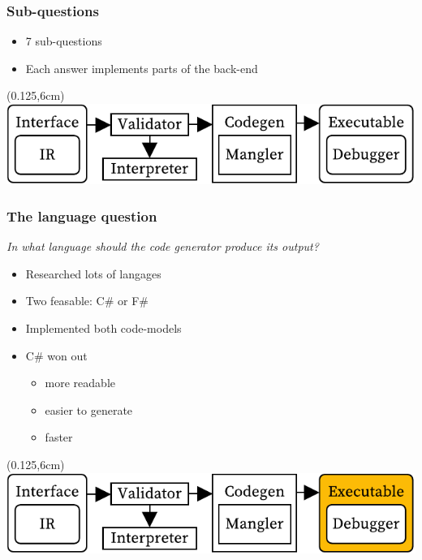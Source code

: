 \documentclass[xetex,serif]{beamer}
\begin{document}
\begin{frame}
\end{frame}\begin{frame}[t]\frametitle{Sub-questions}
\begin{itemize}
    \item 7 sub-questions
    \item Each answer implements parts of the back-end
\end{itemize}
\begin{textblock*}{0.75\paperwidth}(0.125\paperwidth,6cm)\includegraphics[width=0.75\paperwidth]{overview}\end{textblock*}

\end{frame}\begin{frame}[t]\frametitle{The language question}
\textit{In what language should the code generator produce its output?}
\begin{itemize}
    \item Researched lots of langages
    \item Two feasable: C\# or F\#
    \item Implemented both code-models
    \item C\# won out
    \begin{itemize}
        \item more readable
        \item easier to generate
        \item faster
    \end{itemize}
\end{itemize}
\begin{textblock*}{0.75\paperwidth}(0.125\paperwidth,6cm)\includegraphics[width=0.75\paperwidth]{overview_language}\end{textblock*}


\end{frame}
\end{document}
